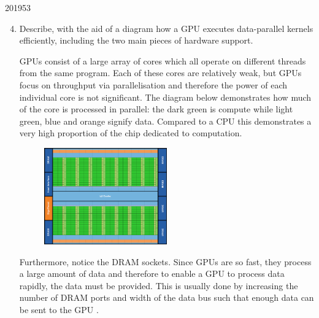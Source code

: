 \documentclass[10pt,\jkfside,a4paper]{article}
\begin{document}
\begin{examquestion}{2019}{5}{3}

\begin{enumerate}[label=(\alph*)]

\setcounter{enumi}{3}

\item Describe, with the aid of a diagram how a GPU executes data-parallel
kernels efficiently, including the two main pieces of hardware support.

GPUs consist of a large array of cores which all operate on different
threads from the same program. Each of these cores are relatively weak, but
GPUs focus on throughput via parallelisation and therefore the power of each
individual core is not significant. The diagram below demonstrates how much
of the core is processed in parallel: the dark green is compute while light
green, blue and orange signify data. Compared to a CPU this demonstrates a
very high proportion of the chip dedicated to computation.

\begin{figure}[H]
\centering
\includegraphics[width=0.5\textwidth]{./fermi_gpu}
\end{figure}

Furthermore, notice the DRAM sockets. Since GPUs are so fast, they process a
large amount of data and therefore to enable a GPU to process data rapidly,
the data must be provided. This is usually done by increasing the number of
DRAM ports and width of the data bus such that enough data can be sent to
the GPU .

\iffalse

\begin{center}

\end{center}
\end{enumerate}
\end{examquestion}
\end{document}
